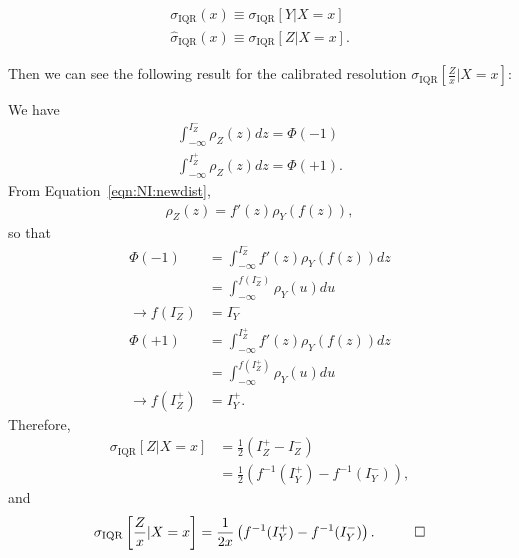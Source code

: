 \begin{align}
\sigma_\text{IQR}(x) \equiv \sigma_\text{IQR}[Y|X=x]\\
\hat{\sigma}_\text{IQR}(x) \equiv \sigma_\text{IQR}[Z|X=x].
\end{align}

\noindent Then we can see the following result for the calibrated resolution $\sigma_\text{IQR}[\frac{Z}{x}|X=x]$:

\vspace{5mm}


\vspace{5mm}

We have
\begin{align}
\int_{-\infty}^{I_Z^-}\rho_Z(z)dz = \Phi(-1)\\
\int_{-\infty}^{I_Z^+}\rho_Z(z)dz = \Phi(+1).
\end{align}
From Equation~\ref{eqn:NI:newdist},
\begin{align}
\rho_Z(z) = f'(z)\rho_Y(f(z)),
\end{align}
so that
\begin{align}
\Phi(-1) &= \int_{-\infty}^{I_Z^-}f'(z)\rho_Y(f(z))dz\nonumber\\
&=\int_{-\infty}^{f(I_Z^-)}\rho_Y(u)du\nonumber\\
\rightarrow f(I_Z^-) &= I_Y^-\\
\Phi(+1) &= \int_{-\infty}^{I_Z^+}f'(z)\rho_Y(f(z))dz\nonumber\\
&=\int_{-\infty}^{f(I_Z^+)}\rho_Y(u)du\nonumber\\
\rightarrow f(I_Z^+) &= I_Y^+.
\end{align}
Therefore,
\begin{align}
\sigma_\text{IQR}[Z|X=x] &= \frac{1}{2}\left(I_Z^+-I_Z^-\right)\nonumber\\
&=\frac{1}{2}\left(f^{-1}(I_Y^+)-f^{-1}(I_Y^-)\right),
\end{align}
and
\begin{align}
\sigma_\text{IQR}\left[\frac{Z}{x}|X=x\right]=\frac{1}{2x}\left(f^{-1}(I_Y^+)-f^{-1}(I_Y^-)\right).\hspace{1 cm}\Box
\label{eqn:NI:resolutionmedian_text}
\end{align}


